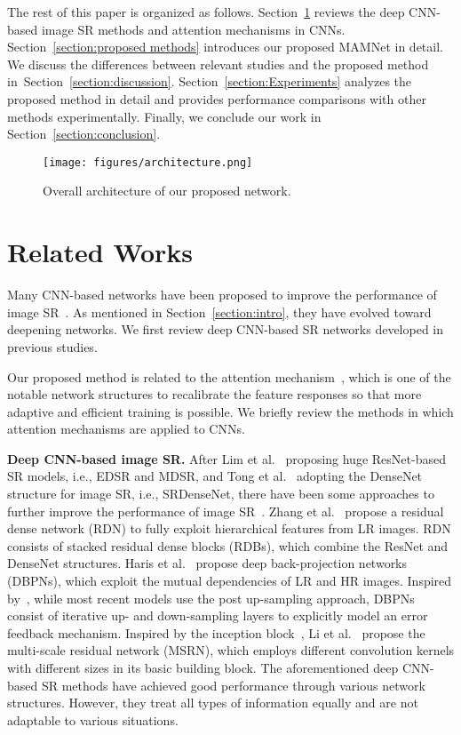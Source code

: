 \documentclass[final,5p,times,twocolumn]{elsarticle}
\begin{document}
The rest of this paper is organized as follows.
Section~\ref{section:related_works} reviews the deep CNN-based image SR methods and attention mechanisms in CNNs.
Section~\ref{section:proposed methods} introduces our proposed MAMNet in detail.
We discuss the differences between relevant studies and the proposed method in~Section~\ref{section:discussion}.
Section~\ref{section:Experiments} analyzes the proposed method in detail and provides performance comparisons with other methods experimentally.
Finally, we conclude our work in Section~\ref{section:conclusion}.

\begin{figure*} [ht]
	\centering
	\texttt{[image: figures/architecture.png]}
	\caption{Overall architecture of our proposed network.} 
	\label{fig:architecture}
\end{figure*}

\section{Related Works}
\label{section:related_works}
Many CNN-based networks have been proposed to improve the performance of image SR~\cite{dong2014learning, kim2016accurate, ledig2016photo, lim2017enhanced, tong2017image, haris2018deep, zhang2018residual, li2018multi, zhang2018rcan}.
As mentioned in Section~\ref{section:intro}, they have evolved toward deepening networks.
We first review deep CNN-based SR networks developed in previous studies.

Our proposed method is related to the attention mechanism~\cite{hu2018squeeze}, which is one of the notable network structures to recalibrate the feature responses so that more adaptive and efficient
training is possible.
We briefly review the methods in which attention mechanisms are applied to CNNs.

\textbf{Deep CNN-based image SR.}
After Lim et al.~\cite{lim2017enhanced} proposing huge ResNet-based SR models, i.e., EDSR and MDSR, and Tong et al.~\cite{tong2017image} adopting the DenseNet structure for image SR, i.e., SRDenseNet, there have been some approaches to further improve the performance of image SR~\cite{haris2018deep,zhang2018residual,li2018multi,zhang2018rcan}.
Zhang et al.~\cite{zhang2018residual} propose a residual dense network (RDN) to fully exploit hierarchical features from LR images.
RDN consists of stacked residual dense blocks (RDBs), which combine the ResNet and DenseNet structures.
Haris et al.~\cite{haris2018deep} propose deep back-projection networks (DBPNs), which exploit the mutual dependencies of LR and HR images.
Inspired by~\cite{irani1991improving}, while most recent models use the post up-sampling approach, DBPNs consist of iterative up- and down-sampling layers to explicitly model an error feedback mechanism.   
Inspired by the inception block~\cite{szegedy2015going}, Li et al.~\cite{li2018multi} propose the multi-scale residual network (MSRN), which employs different convolution kernels with different sizes in its basic building block.
The aforementioned deep CNN-based SR methods have achieved good performance through various network structures.
However, they treat all types of information equally and are not adaptable to various situations.
\end{document}
